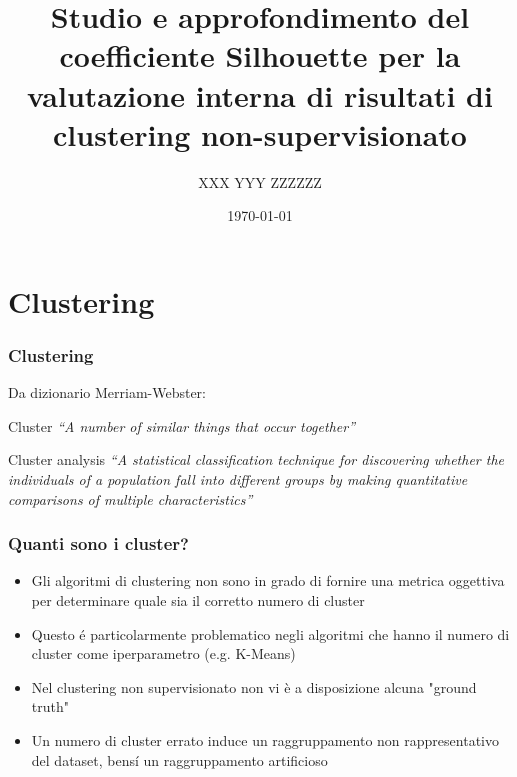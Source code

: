 \documentclass{beamer}
\title{Studio e approfondimento del coefficiente Silhouette per la
valutazione interna di risultati di clustering non-supervisionato}
\author{XXX YYY ZZZZZZ}
\date{\today}
\begin{document}
    \begin{frame}
        \titlepage
    \end{frame}


    \section{Clustering}

        \begin{frame}
            \frametitle{Clustering}

            Da dizionario Merriam-Webster:

            \vfill

            \begin{block}{Cluster}
                \emph{``A number of similar things that occur together''}
            \end{block}

            \vfill

            \begin{block}{Cluster analysis}
                \emph{``A statistical classification technique for discovering
                      whether the individuals of a population fall into different groups
                      by making quantitative comparisons of multiple characteristics''}
            \end{block}
        \end{frame}

        \begin{frame}
            \frametitle{Quanti sono i cluster?}

            \begin{itemize}
                \item
                Gli algoritmi di clustering non sono in grado di fornire una
                metrica oggettiva per determinare quale sia il corretto numero
                di cluster
                \item
                Questo é particolarmente problematico negli algoritmi che hanno
                il numero di cluster come iperparametro (e.g. K-Means)
                \item
                Nel clustering non supervisionato non vi è a disposizione
                alcuna "ground truth"
                \item
                Un numero di cluster errato induce un raggruppamento non
                rappresentativo del dataset, bensí un raggruppamento artificioso
            \end{itemize}
        \end{frame}
\end{document}
